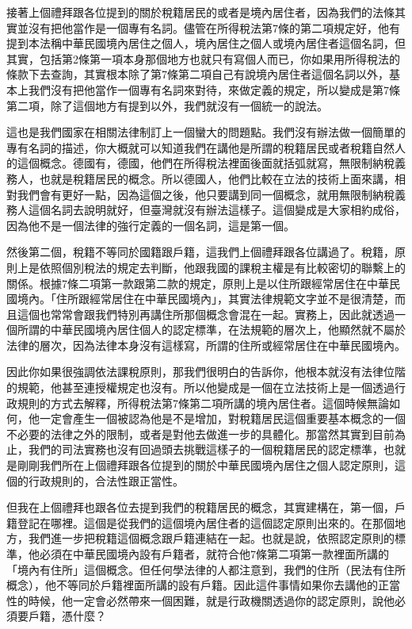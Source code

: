 \documentclass[oneside,sub3section]{ctexbook}
\begin{document}
接著上個禮拜跟各位提到的關於稅籍居民的或者是境內居住者，因為我們的法條其實並沒有把他當作是一個專有名詞。儘管在所得稅法第7條的第二項規定好，他有提到本法稱中華民國境內居住之個人，境內居住之個人或境內居住者這個名詞，但其實，包括第2條第一項本身那個地方也就只有寫個人而已，你如果用所得稅法的條款下去查詢，其實根本除了第7條第二項自己有說境內居住者這個名詞以外，基本上我們沒有把他當作一個專有名詞來對待，來做定義的規定，所以變成是第7條第二項，除了這個地方有提到以外，我們就沒有一個統一的說法。

這也是我們國家在相關法律制訂上一個蠻大的問題點。我們沒有辦法做一個簡單的專有名詞的描述，你大概就可以知道我們在講他是所謂的稅籍居民或者稅籍自然人的這個概念。德國有，德國，他們在所得稅法裡面後面就括弧就寫，無限制納稅義務人，也就是稅籍居民的概念。所以德國人，他們比較在立法的技術上面來講，相對我們會有更好一點，因為這個之後，他只要講到同一個概念，就用無限制納稅義務人這個名詞去說明就好，但臺灣就沒有辦法這樣子。這個變成是大家相約成俗，因為他不是一個法律的強行定義的一個名詞，這是第一個。

然後第二個，稅籍不等同於國籍跟戶籍，這我們上個禮拜跟各位講過了。稅籍，原則上是依照個別稅法的規定去判斷，他跟我國的課稅主權是有比較密切的聯繫上的關係。根據7條二項第一款跟第二款的規定，原則上是以住所跟經常居住在中華民國境內。「住所跟經常居住在中華民國境內」，其實法律規範文字並不是很清楚，而且這個也常常會跟我們特別再講住所那個概念會混在一起。實務上，因此就透過一個所謂的中華民國境內居住個人的認定標準，在法規範的層次上，他顯然就不屬於法律的層次，因為法律本身沒有這樣寫，所謂的住所或經常居住在中華民國境內。

因此你如果很強調依法課稅原則，那我們很明白的告訴你，他根本就沒有法律位階的規範，他甚至連授權規定也沒有。所以他變成是一個在立法技術上是一個透過行政規則的方式去解釋，所得稅法第7條第二項所講的境內居住者。這個時候無論如何，他一定會產生一個被認為他是不是增加，對稅籍居民這個重要基本概念的一個不必要的法律之外的限制，或者是對他去做進一步的具體化。那當然其實到目前為止，我們的司法實務也沒有回過頭去挑戰這樣子的一個稅籍居民的認定標準，也就是剛剛我們所在上個禮拜跟各位提到的關於中華民國境內居住之個人認定原則，這個的行政規則的，合法性跟正當性。

但我在上個禮拜也跟各位去提到我們的稅籍居民的概念，其實建構在，第一個，戶籍登記在哪裡。這個是從我們的這個境內居住者的這個認定原則出來的。在那個地方，我們進一步把稅籍這個概念跟戶籍連結在一起。也就是說，依照認定原則的標準，他必須在中華民國境內設有戶籍者，就符合他7條第二項第一款裡面所講的「境內有住所」這個概念。但任何學法律的人都注意到，我們的住所（民法有住所概念），他不等同於戶籍裡面所講的設有戶籍。因此這件事情如果你去講他的正當性的時候，他一定會必然帶來一個困難，就是行政機關透過你的認定原則，說他必須要戶籍，憑什麼？
\end{document}
